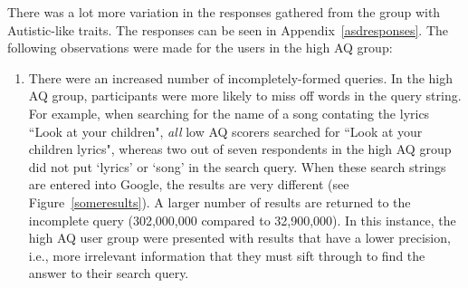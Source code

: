 \documentclass[a4paper, 11pt]{article}
\begin{document}
There was a lot more variation in the responses gathered from the group with Autistic-like traits. The responses can be seen in Appendix~\ref{asdresponses}. The following observations were made for the users in the high AQ group:
\begin{enumerate}
\item{There were an increased number of incompletely-formed queries. In the high AQ group, participants were more likely to miss off words in the query string. For example, when searching for the name of a song contating the lyrics ``Look at your children", \textit{all} low AQ scorers searched for ``Look at your children lyrics", whereas two out of seven respondents in the high AQ group did not put `lyrics' or `song' in the search query. When these search strings are entered into Google, the results are very different (see Figure~\ref{someresults}). A larger number of results are returned to the incomplete query (302,000,000 compared to 32,900,000). In this instance, the high AQ user group were presented with results that have a lower precision, i.e., more irrelevant information that they must sift through to find the answer to their search query.}
\label{incomplete}


\end{enumerate}
\end{document}
